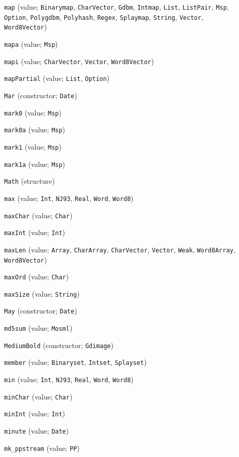 \begin{description}
\item[] \verb"map" (value; \verb"Binarymap", \verb"CharVector", \verb"Gdbm", \verb"Intmap", \verb"List", \verb"ListPair", \verb"Msp", \verb"Option", \verb"Polygdbm", \verb"Polyhash", \verb"Regex", \verb"Splaymap", \verb"String", \verb"Vector", \verb"Word8Vector")
\item[] \verb"mapa" (value; \verb"Msp")
\item[] \verb"mapi" (value; \verb"CharVector", \verb"Vector", \verb"Word8Vector")
\item[] \verb"mapPartial" (value; \verb"List", \verb"Option")
\item[] \verb"Mar" (constructor; \verb"Date")
\item[] \verb"mark0" (value; \verb"Msp")
\item[] \verb"mark0a" (value; \verb"Msp")
\item[] \verb"mark1" (value; \verb"Msp")
\item[] \verb"mark1a" (value; \verb"Msp")
\item[] \verb"Math" (structure)
\item[] \verb"max" (value; \verb"Int", \verb"NJ93", \verb"Real", \verb"Word", \verb"Word8")
\item[] \verb"maxChar" (value; \verb"Char")
\item[] \verb"maxInt" (value; \verb"Int")
\item[] \verb"maxLen" (value; \verb"Array", \verb"CharArray", \verb"CharVector", \verb"Vector", \verb"Weak", \verb"Word8Array", \verb"Word8Vector")
\item[] \verb"maxOrd" (value; \verb"Char")
\item[] \verb"maxSize" (value; \verb"String")
\item[] \verb"May" (constructor; \verb"Date")
\item[] \verb"md5sum" (value; \verb"Mosml")
\item[] \verb"MediumBold" (constructor; \verb"Gdimage")
\item[] \verb"member" (value; \verb"Binaryset", \verb"Intset", \verb"Splayset")
\item[] \verb"min" (value; \verb"Int", \verb"NJ93", \verb"Real", \verb"Word", \verb"Word8")
\item[] \verb"minChar" (value; \verb"Char")
\item[] \verb"minInt" (value; \verb"Int")
\item[] \verb"minute" (value; \verb"Date")
\item[] \verb"mk_ppstream" (value; \verb"PP")

\end{description}
